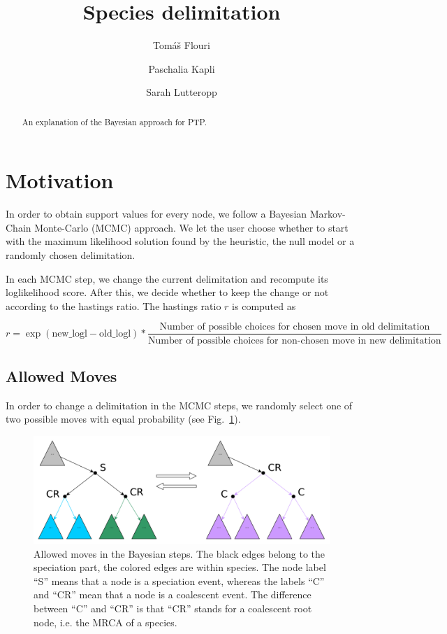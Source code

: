 \documentclass{llncs}
\begin{document}
\title{Species delimitation}


\author{Tom\'{a}\v{s} Flouri \and Paschalia Kapli \and Sarah Lutteropp}

\maketitle

\begin{abstract}
An explanation of the Bayesian approach for PTP.\@
\end{abstract}

\section{Motivation}

In order to obtain support values for every node, we follow a Bayesian Markov-Chain Monte-Carlo (MCMC) approach. We let the user choose whether to start with the maximum likelihood solution found by the heuristic, the null model or a randomly chosen delimitation.

In each MCMC step, we change the current delimitation and recompute its loglikelihood score. After this, we decide whether to keep the change or not according to the hastings ratio. The hastings ratio $r$ is computed as

$$r = \exp(\text{new\_logl} - \text{old\_logl}) * \frac{\text{Number of possible choices for chosen move in old delimitation}}{\text{Number of possible choices for non-chosen move in new delimitation}}$$

\subsection{Allowed Moves}

In order to change a delimitation in the MCMC steps, we randomly select one of two possible moves with equal probability (see Fig.~\ref{fig:moves}).

\begin{figure}[h!]
\centering
\includegraphics[scale=0.4]{images/moves.pdf}
\caption{Allowed moves in the Bayesian steps. The black edges belong to the speciation part, the colored edges are within species. The node label ``S'' means that a node is a speciation event, whereas the labels ``C'' and ``CR'' mean that a node is a coalescent event. The difference between ``C'' and ``CR'' is that ``CR'' stands for a coalescent root node, i.e. the MRCA of a species.}
\label{fig:moves}
\end{figure}
\end{document}
